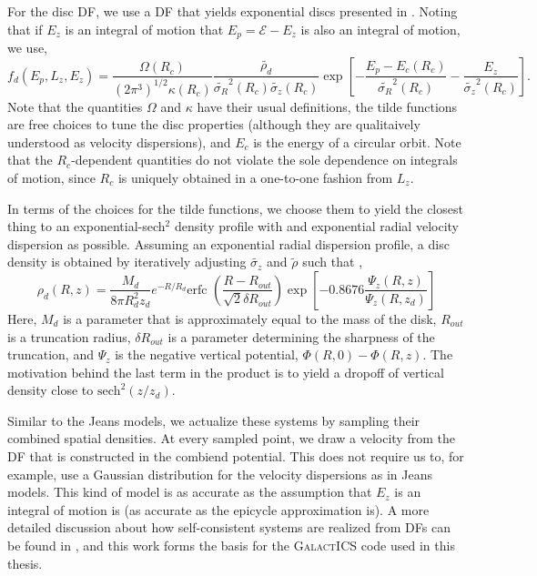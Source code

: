 For the disc DF, we use a DF that yields exponential discs presented in \citet{kd95galactics}. Noting that if $E_z$ is an integral of motion that $E_p = \mathcal{E} - E_z$ is also an integral of motion, we use,
\begin{equation}
f_d(E_p,L_z,E_z) = \frac{\Omega(R_c)}{(2 \pi^3)^{1/2} \kappa(R_c)} \frac{\tilde{\rho_d}}{\tilde{\sigma_R}^2(R_c) \tilde{\sigma_z}(R_c)} \exp\left[-\frac{E_p - E_c(R_c)}{\tilde{\sigma_R}^2(R_c)}  - \frac{E_z}{\tilde{\sigma_z}^2(R_c)}\right].
\end{equation}
Note that the quantities $\Omega$ and $\kappa$ have their usual definitions, the tilde functions are free choices to tune the disc properties (although they are qualitaively understood as velocity dispersions), and $E_c$ is the energy of a circular orbit. Note that the $R_c$-dependent quantities do not violate the sole dependence on integrals of motion, since $R_c$ is uniquely obtained in a one-to-one fashion from $L_z$.

In terms of the choices for the tilde functions, we choose them to yield the closest thing to an exponential-sech$^2$ density profile with and exponential radial velocity dispersion as possible. Assuming an exponential radial dispersion profile, a disc density is obtained by iteratively adjusting $\tilde{\sigma_z}$ and $\tilde{\rho}$ such that \citep{kd95galactics},
\begin{equation}
\rho_d(R,z) = \frac{M_d}{8 \pi R_d^2 z_d} e^{-R/R_d} \text{erfc }\left(\frac{R - R_{out}}{\sqrt{2} \delta R_{out}}\right) \exp \left[ -0.8676 \frac{\Psi_z(R,z)}{\Psi_z(R,z_d)}\right]
\end{equation}
Here, $M_d$ is a parameter that is approximately equal to the mass of the disk, $R_{out}$ is a truncation radius, $\delta R_{out}$ is a parameter determining the sharpness of the truncation, and $\Psi_z$ is the negative vertical potential, $\Phi(R,0) - \Phi(R,z)$. The motivation behind the last term in the product is to yield a dropoff of vertical density close to $\text{sech}^2(z/z_d)$.

Similar to the  Jeans models, we actualize these systems by sampling their combined spatial densities. At every sampled point, we draw a velocity from the DF that is constructed in the combiend potential. This does not require us to, for example, use a Gaussian distribution for the velocity dispersions as in Jeans models. This kind of model is as accurate as the assumption that $E_z$ is an integral of motion is (as accurate as the epicycle approximation is). A more detailed discussion about how self-consistent systems are realized from DFs can be found in \citet{kd95galactics}, and this work forms the basis for the \textsc{GalactICS} code used in this thesis.

